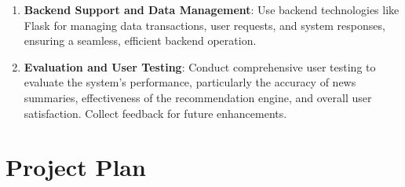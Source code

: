 \documentclass[a4paper]{article}
\begin{document}
\begin{enumerate}
    \item {\bf Backend Support and Data Management}: Use backend technologies like Flask for managing data transactions, user requests, and system responses, ensuring a seamless, efficient backend operation.
    \item {\bf Evaluation and User Testing}: Conduct comprehensive user testing to evaluate the system's performance, particularly the accuracy of news summaries, effectiveness of the recommendation engine, and overall user satisfaction. Collect feedback for future enhancements.
\end{enumerate}

\section{Project Plan}

\end{document}
